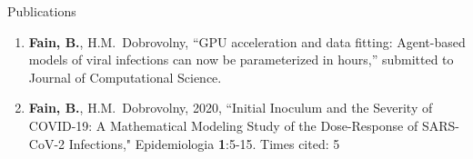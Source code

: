 Publications 
\begin{enumerate} 

\item \textbf{Fain, B.}, H.M.\ Dobrovolny, ``GPU acceleration and data fitting: Agent-based models of viral infections can now be parameterized in hours,'' submitted to Journal of Computational Science.
\item \textbf{Fain, B.}, H.M.\ Dobrovolny, 2020, ``Initial Inoculum and the Severity of COVID-19: A Mathematical Modeling Study of the Dose-Response of SARS-CoV-2 Infections," Epidemiologia \textbf{1}:5-15. Times cited: 5 
\end{enumerate}

